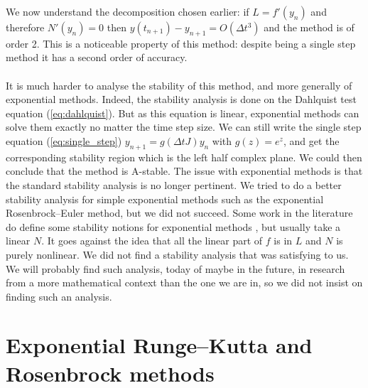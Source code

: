       We now understand the decomposition chosen earlier: if $L = f'\left(y_n\right)$ and therefore $N'\left(y_n\right) = 0$ then $y\left(t_{n+1}\right) - y_{n+1} = O\left(\Delta t^3\right)$ and the method is of order 2.
      This is a noticeable property of this method: despite being a single step method it has a second order of accuracy.

      \paragraph{}
      It is much harder to analyse the stability of this method, and more generally of exponential methods.
      Indeed, the stability analysis is done on the Dahlquist test equation (\ref{eq:dahlquist}).
      But as this equation is linear, exponential methods can solve them exactly no matter the time step size.
      We can still write the single step equation (\ref{eq:single_step}) $y_{n+1} = g\left(\Delta tJ\right)y_n$ with $g\left(z\right) = e^z$, and get the corresponding stability region which is the left half complex plane.
      We could then conclude that the method is A-stable.
      The issue with exponential methods is that the standard stability analysis is no longer pertinent.
      We tried to do a better stability analysis for simple exponential methods such as the exponential Rosenbrock--Euler method, but we did not succeed.
      Some work in the literature do define some stability notions for exponential methods \cite{DuZhu2004}, but usually take a linear $N$.
      It goes against the idea that all the linear part of $f$ is in $L$ and $N$ is purely nonlinear.
      We did not find a stability analysis that was satisfying to us.
      We will probably find such analysis, today of maybe in the future, in research from a more mathematical context than the one we are in, so we did not insist on finding such an analysis.


  \section{Exponential Runge--Kutta and Rosenbrock methods}

